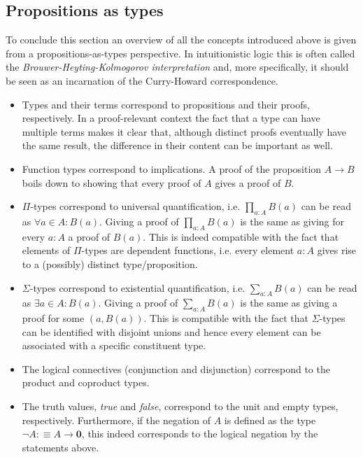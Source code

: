 \subsection{Propositions as types}

    To conclude this section an overview of all the concepts introduced above is given from a propositions-as-types perspective. In intuitionistic logic this is often called the \textit{Brouwer-Heyting-Kolmogorov interpretation} and, more specifically, it should be seen as an incarnation of the Curry-Howard correspondence.

    \begin{itemize}
        \item Types and their terms correspond to propositions and their proofs, respectively. In a proof-relevant context the fact that a type can have multiple terms makes it clear that, although distinct proofs eventually have the same result, the difference in their content can be important as well.
        \item Function types correspond to implications. A proof of the proposition $A\rightarrow B$ boils down to showing that every proof of $A$ gives a proof of $B$.
        \item $\Pi$-types correspond to universal quantification, i.e. $\prod_{a:A}B(a)$ can be read as $\forall a\in A: B(a)$. Giving a proof of $\prod_{a:A}B(a)$ is the same as giving for every $a:A$ a proof of $B(a)$. This is indeed compatible with the fact that elements of $\Pi$-types are dependent functions, i.e. every element $a:A$ gives rise to a (possibly) distinct type/proposition.
        \item $\Sigma$-types correspond to existential quantification, i.e. $\sum_{a:A}B(a)$ can be read as $\exists a\in A:B(a)$. Giving a proof of $\sum_{a:A}B(a)$ is the same as giving a proof for some $(a, B(a))$. This is compatible with the fact that $\Sigma$-types can be identified with disjoint unions and hence every element can be associated with a specific constituent type.
        \item The logical connectives (conjunction and disjunction) correspond to the product and coproduct types.
        \item The truth values, \textit{true} and \textit{false}, correspond to the unit and empty types, respectively. Furthermore, if the negation of $A$ is defined as the type $\lnot A:\equiv A\rightarrow\mathbf{0}$, this indeed corresponds to the logical negation by the statements above.
    \end{itemize}


